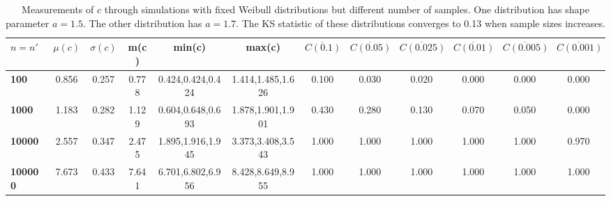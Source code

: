 \begin{table*}[h!]
\vspace{-.3cm}
\begin{center}
\begin{tabular}{| l | c | c | c | c | c | c | c | c | c | c | c |}\hline
$n=n'$ & $\mu(c)$ & $\sigma(c)$ & m(c) & min(c) & max(c) & $\overline{C(0.1)}$ & $\overline{C(0.05)}$ & $\overline{C(0.025)}$ & $\overline{C(0.01)}$ & $\overline{C(0.005)}$ & $\overline{C(0.001)}$ \\\hline\hline
{\bf 100} & 0.856 & 0.257 & 0.778 & 0.424,0.424,0.424 & 1.414,1.485,1.626 & 0.100 & 0.030 & 0.020 & 0.000 & 0.000 & 0.000 \\\hline
{\bf 1000} & 1.183 & 0.282 & 1.129 & 0.604,0.648,0.693 & 1.878,1.901,1.901 & 0.430 & 0.280 & 0.130 & 0.070 & 0.050 & 0.000 \\\hline
{\bf 10000} & 2.557 & 0.347 & 2.475 & 1.895,1.916,1.945 & 3.373,3.408,3.543 & 1.000 & 1.000 & 1.000 & 1.000 & 1.000 & 0.970 \\\hline
{\bf 100000} & 7.673 & 0.433 & 7.641 & 6.701,6.802,6.956 & 8.428,8.649,8.955 & 1.000 & 1.000 & 1.000 & 1.000 & 1.000 & 1.000 \\\hline
\end{tabular}
\caption{Measurements of $c$ through simulations
        with fixed Weibull distributions but different number of samples.
        One distribution has shape parameter $a=1.5$.
        The other distribution has $a=1.7$.
        The KS statistic of these distributions converges
        to 0.13 when sample sizes increases.}
\end{center}
\end{table*}